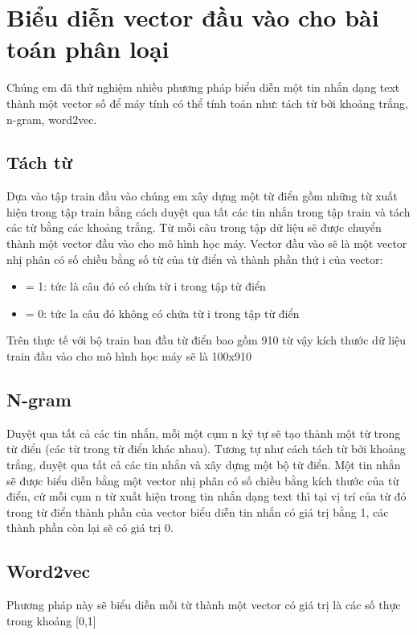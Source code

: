 \documentclass[a4paper,12pt]{report}
\begin{document}
\section{Biểu diễn vector đầu vào cho bài toán phân loại}
Chúng em đã thử nghiệm nhiều phương pháp biểu diễn một tin nhắn dạng text thành một vector số để máy tính có thể tính toán như: tách từ bởi khoảng trắng, n-gram, word2vec.
\subsection{Tách từ}
Dựa vào tập train đầu vào chúng em xây dựng một từ điển gồm những từ xuất hiện trong tập train bằng cách duyệt qua tất các tin nhắn trong tập train và tách các từ bằng các khoảng trắng. Từ mỗi câu trong tập dữ liệu sẽ được chuyển thành một vector đầu vào cho mô hình học máy. Vector đầu vào sẽ là một vector nhị phân có số chiều bằng số từ của từ điển và thành phần thứ i của vector: 
\begin{itemize}
\item = 1: tức là câu đó có chứa từ i trong tập từ điển
\item = 0: tức la câu đó không có chứa từ i trong tập từ điển
\end{itemize}

Trên thực tế với bộ train ban đầu từ điển bao gồm 910 từ vậy kích thước dữ liệu train đầu vào cho mô hình học máy sẽ là 100x910

\subsection{N-gram}
Duyệt qua tất cả các tin nhắn, mỗi một cụm n ký tự sẽ tạo thành một từ trong từ điển (các từ trong từ điển khác nhau). Tương tự như cách tách từ bởi khoảng trắng, duyệt qua tất cả các tin nhắn và xây dựng một bộ từ điển. Một tin nhắn sẽ được biểu diễn bằng một vector nhị phân có số chiều bằng kích thước của từ điển, cứ mỗi cụm n từ xuất hiện trong tin nhắn dạng text thì tại vị trí của từ đó trong từ điển thành phần của vector biểu diễn tin nhắn có giá trị bằng 1, các thành phần còn lại sẽ có giá trị 0.

\subsection{Word2vec}
Phương pháp này sẽ biểu diễn mỗi từ thành một vector có giá trị là các số thực trong khoảng [0,1]
\end{document}
